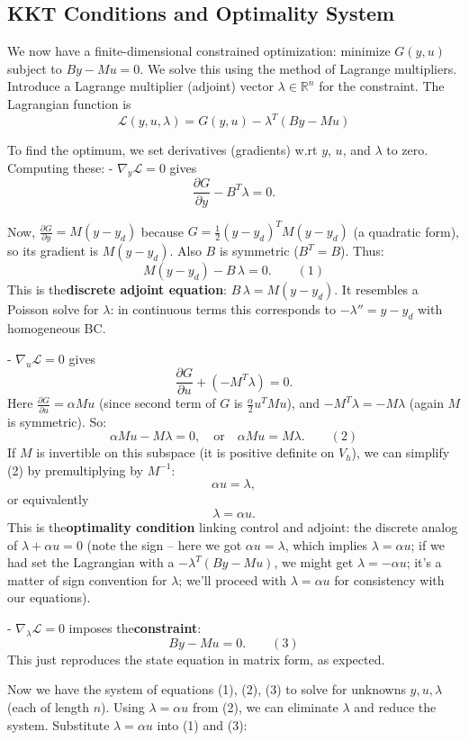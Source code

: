 \documentclass[a4paper,10pt]{article}
\begin{document}
\subsection{KKT Conditions and Optimality System}
We now have a finite-dimensional constrained optimization: minimize \(G(y,u)\) subject to \(B y - M u = 0\). We solve this using the method of Lagrange multipliers.
Introduce a Lagrange multiplier (adjoint) vector \(\lambda \in \mathbb{R}^n\) for the constraint. The Lagrangian function is
\[\mathcal{L}(y,u,\lambda) = G(y,u) - \lambda^T (B y - M u)\]

To find the optimum, we set derivatives (gradients) w.rt \(y\), \(u\), and \(\lambda\) to zero.
Computing these:
- \(\nabla_y \mathcal{L} = 0\) gives
\[\frac{\partial G}{\partial y} - B^T \lambda = 0.\]

Now, \(\frac{\partial G}{\partial y} = M(y - y_d)\) because \(G = \frac{1}{2}(y-y_d)^T M (y-y_d)\) (a quadratic form), so its gradient is \(M(y - y_d)\). Also \(B\) is symmetric (\(B^T = B\)). Thus:
\[M (y - y_d) - B\,\lambda = 0. \qquad (1)\]
This is the\textbf{discrete adjoint equation}: \(B\,\lambda = M (y - y_d)\). It resembles a Poisson solve for \(\lambda\): in continuous terms this corresponds to \(- \lambda'' = y - y_d\) with homogeneous BC.

- \(\nabla_u \mathcal{L} = 0\) gives
\[\frac{\partial G}{\partial u} + (-M^T \lambda) = 0.\]
Here \(\frac{\partial G}{\partial u} = \alpha M u\) (since second term of \(G\) is \(\frac{\alpha}{2} u^T M u\)), and \(-M^T \lambda = -M \lambda\) (again \(M\) is symmetric). So:
\[\alpha M u - M \lambda = 0, \quad \text{or} \quad \alpha M u = M \lambda. \qquad (2)\]
If \(M\) is invertible on this subspace (it is positive definite on \(V_h\)), we can simplify (2) by premultiplying by \(M^{-1}\):
\[\alpha u = \lambda,\]
or equivalently \[\lambda = \alpha u.\]
This is the\textbf{optimality condition} linking control and adjoint: the discrete analog of \(\lambda + \alpha u = 0\) (note the sign – here we got \(\alpha u = \lambda\), which implies \(\lambda = \alpha u\); if we had set the Lagrangian with a \(-\lambda^T(By - Mu)\), we might get \(\lambda = -\alpha u\); it's a matter of sign convention for \(\lambda\); we'll proceed with \(\lambda = \alpha u\) for consistency with our equations).

- \(\nabla_{\lambda} \mathcal{L} = 0\) imposes the\textbf{constraint}:
\[B y - M u = 0. \qquad (3)\]
This just reproduces the state equation in matrix form, as expected.

Now we have the system of equations (1), (2), (3) to solve for unknowns \(y, u, \lambda\) (each of length \(n\)). Using \(\lambda = \alpha u\) from (2), we can eliminate \(\lambda\) and reduce the system. Substitute \(\lambda = \alpha u\) into (1) and (3):
\end{document}
